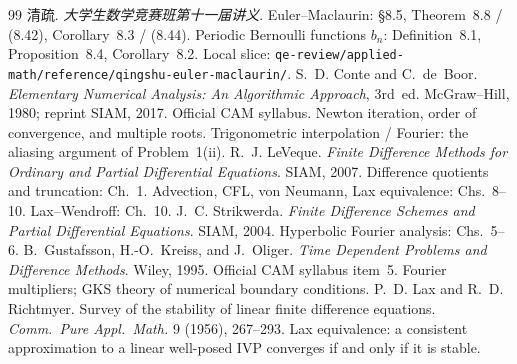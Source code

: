 \documentclass[11pt,a4paper]{article}
\begin{document}
\begin{thebibliography}{99}
清疏.
\newblock \emph{大学生数学竞赛班第十一届讲义}.
\newblock Euler--Maclaurin: \S8.5, Theorem~8.8 / (8.42), Corollary~8.3 / (8.44). Periodic Bernoulli functions \(b_{n}\): Definition~8.1, Proposition~8.4, Corollary~8.2. Local slice: \texttt{qe-review/applied-math/reference/qingshu-euler-maclaurin/}.
S.~D. Conte and C.~de~Boor.
\newblock \emph{Elementary Numerical Analysis: An Algorithmic Approach}, 3rd~ed.
\newblock McGraw--Hill, 1980; reprint SIAM, 2017.
\newblock Official CAM syllabus. Newton iteration, order of convergence, and multiple roots. Trigonometric interpolation / Fourier: the aliasing argument of Problem~1(ii).
R.~J. LeVeque.
\newblock \emph{Finite Difference Methods for Ordinary and Partial Differential Equations}.
\newblock SIAM, 2007.
\newblock Difference quotients and truncation: Ch.~1. Advection, CFL, von Neumann, Lax equivalence: Chs.~8--10. Lax--Wendroff: Ch.~10.
J.~C. Strikwerda.
\newblock \emph{Finite Difference Schemes and Partial Differential Equations}.
\newblock SIAM, 2004.
\newblock Hyperbolic Fourier analysis: Chs.~5--6.
B.~Gustafsson, H.-O.~Kreiss, and J.~Oliger.
\newblock \emph{Time Dependent Problems and Difference Methods}.
\newblock Wiley, 1995.
\newblock Official CAM syllabus item~5. Fourier multipliers; GKS theory of numerical boundary conditions.
P.~D. Lax and R.~D. Richtmyer.
\newblock Survey of the stability of linear finite difference equations.
\newblock \emph{Comm.\ Pure Appl.\ Math.} 9 (1956), 267--293.
\newblock Lax equivalence: a consistent approximation to a linear well-posed IVP converges if and only if it is stable.
\end{thebibliography}
\end{document}
